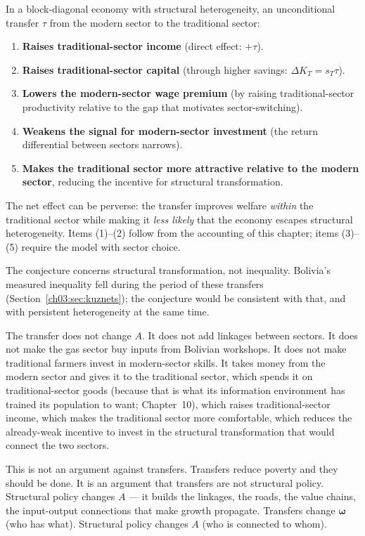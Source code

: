 \documentclass[../structural_economics_book.tex]{subfiles}
\begin{document}
\begin{conjecture}\label{ch03:prop:transfer_perversity}
In a block-diagonal economy with structural heterogeneity, an unconditional transfer $\tau$ from the modern sector to the traditional sector:
\begin{enumerate}
\item \textbf{Raises traditional-sector income} (direct effect: $+\tau$).
\item \textbf{Raises traditional-sector capital} (through higher savings: $\Delta K_T = s_T \tau$).
\item \textbf{Lowers the modern-sector wage premium} (by raising traditional-sector productivity relative to the gap that motivates sector-switching).
\item \textbf{Weakens the signal for modern-sector investment} (the return differential between sectors narrows).
\item \textbf{Makes the traditional sector more attractive relative to the modern sector}, reducing the incentive for structural transformation.
\end{enumerate}

The net effect can be perverse: the transfer improves welfare \textit{within} the traditional sector while making it \textit{less likely} that the economy escapes structural heterogeneity. Items (1)--(2) follow from the accounting of this chapter; items (3)--(5) require the model with sector choice.
\end{conjecture}

The conjecture concerns structural transformation, not inequality. Bolivia's measured inequality fell during the period of these transfers (Section~\ref{ch03:sec:kuznets}); the conjecture would be consistent with that, and with persistent heterogeneity at the same time.

\begin{intuition}
The transfer does not change $A$. It does not add linkages between sectors. It does not make the gas sector buy inputs from Bolivian workshops. It does not make traditional farmers invest in modern-sector skills. It takes money from the modern sector and gives it to the traditional sector, which spends it on traditional-sector goods (because that is what its information environment has trained its population to want; Chapter~10), which raises traditional-sector income, which makes the traditional sector more comfortable, which reduces the already-weak incentive to invest in the structural transformation that would connect the two sectors.

This is not an argument against transfers. Transfers reduce poverty and they should be done. It is an argument that transfers are not structural policy. Structural policy changes $A$ --- it builds the linkages, the roads, the value chains, the input-output connections that make growth propagate. Transfers change $\boldsymbol{\omega}$ (who has what). Structural policy changes $A$ (who is connected to whom).
\end{intuition}
\end{document}
